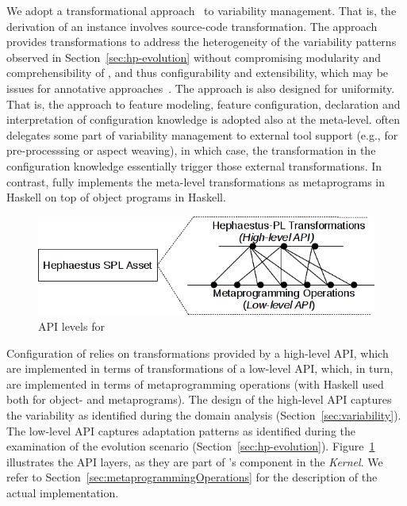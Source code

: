 We adopt a transformational approach~\cite{deltaSchaefer} to variability management. That is, the derivation of an \hpl{} instance involves source-code transformation. The approach provides transformations to address the heterogeneity of the variability patterns observed in Section~\ref{sec:hp-evolution} without compromising modularity and comprehensibility of \hpl, and thus configurability and extensibility, which may be issues for annotative approaches~\cite{kastner:2008}. The approach is also designed for uniformity. That is, the \hp{} approach to feature modeling, feature configuration, declaration and interpretation of configuration knowledge is adopted also at the meta-level. \hp{} often delegates some part of variability management to external tool support (e.g., for pre-processsing or aspect weaving), in which case, the transformation in the configuration knowledge essentially trigger those external transformations. In contrast, \hpl{} fully implements the meta-level transformations as metaprograms in Haskell on top of object programs in Haskell.


\begin{figure}[t!]
\includegraphics[scale=0.7]{imagens/apis-hpl-asset.png}
\caption{API levels for \hpsplasset}
\label{fig:hpl-apis}
\end{figure}


Configuration of \hpl{} relies on transformations provided by a high-level API, which are implemented in terms of 
transformations of a low-level API, which, in turn, are implemented in terms of metaprogramming operations (with Haskell used both for object- and metaprograms).  The design of the high-level API captures the variability as identified during the domain analysis (Section~\ref{sec:variability}). The low-level API captures adaptation patterns as identified during the examination of the evolution scenario (Section~\ref{sec:hp-evolution}). Figure~\ref{fig:hpl-apis} illustrates the API layers, as they are part of \hpl's component \hpsplasset{} in the \emph{Kernel}. We refer to  Section~\ref{sec:metaprogrammingOperations} for the description of the actual implementation.

